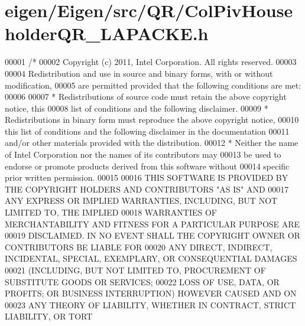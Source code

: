 \hypertarget{eigen_2_eigen_2src_2_q_r_2_col_piv_householder_q_r___l_a_p_a_c_k_e_8h_source}{}\section{eigen/\+Eigen/src/\+Q\+R/\+Col\+Piv\+Householder\+Q\+R\+\_\+\+L\+A\+P\+A\+C\+KE.h}
\label{eigen_2_eigen_2src_2_q_r_2_col_piv_householder_q_r___l_a_p_a_c_k_e_8h_source}

\begin{DoxyCode}
00001 \textcolor{comment}{/*}
00002 \textcolor{comment}{ Copyright (c) 2011, Intel Corporation. All rights reserved.}
00003 \textcolor{comment}{}
00004 \textcolor{comment}{ Redistribution and use in source and binary forms, with or without modification,}
00005 \textcolor{comment}{ are permitted provided that the following conditions are met:}
00006 \textcolor{comment}{}
00007 \textcolor{comment}{ * Redistributions of source code must retain the above copyright notice, this}
00008 \textcolor{comment}{   list of conditions and the following disclaimer.}
00009 \textcolor{comment}{ * Redistributions in binary form must reproduce the above copyright notice,}
00010 \textcolor{comment}{   this list of conditions and the following disclaimer in the documentation}
00011 \textcolor{comment}{   and/or other materials provided with the distribution.}
00012 \textcolor{comment}{ * Neither the name of Intel Corporation nor the names of its contributors may}
00013 \textcolor{comment}{   be used to endorse or promote products derived from this software without}
00014 \textcolor{comment}{   specific prior written permission.}
00015 \textcolor{comment}{}
00016 \textcolor{comment}{ THIS SOFTWARE IS PROVIDED BY THE COPYRIGHT HOLDERS AND CONTRIBUTORS "AS IS" AND}
00017 \textcolor{comment}{ ANY EXPRESS OR IMPLIED WARRANTIES, INCLUDING, BUT NOT LIMITED TO, THE IMPLIED}
00018 \textcolor{comment}{ WARRANTIES OF MERCHANTABILITY AND FITNESS FOR A PARTICULAR PURPOSE ARE}
00019 \textcolor{comment}{ DISCLAIMED. IN NO EVENT SHALL THE COPYRIGHT OWNER OR CONTRIBUTORS BE LIABLE FOR}
00020 \textcolor{comment}{ ANY DIRECT, INDIRECT, INCIDENTAL, SPECIAL, EXEMPLARY, OR CONSEQUENTIAL DAMAGES}
00021 \textcolor{comment}{ (INCLUDING, BUT NOT LIMITED TO, PROCUREMENT OF SUBSTITUTE GOODS OR SERVICES;}
00022 \textcolor{comment}{ LOSS OF USE, DATA, OR PROFITS; OR BUSINESS INTERRUPTION) HOWEVER CAUSED AND ON}
00023 \textcolor{comment}{ ANY THEORY OF LIABILITY, WHETHER IN CONTRACT, STRICT LIABILITY, OR TORT}

\end{DoxyCode}
